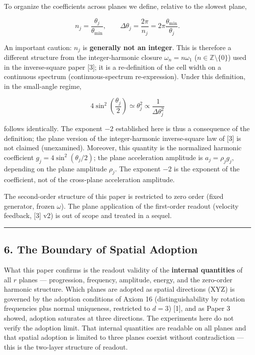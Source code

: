 \documentclass[
  a4paper,
]{article}
\begin{document}
To organize the coefficients across planes we define, relative to the
slowest plane,

\[
n_j=\frac{\theta_j}{\theta_{\min}},
\qquad
\Delta\theta_j=\frac{2\pi}{n_j}=2\pi\frac{\theta_{\min}}{\theta_j}.
\]

An important caution: \(n_j\) is \textbf{generally not an integer}. This
is therefore a different structure from the integer-harmonic closure
\(\omega_n=n\omega_1\) (\(n\in\mathbb Z\setminus\{0\}\)) used in the
inverse-square paper {[}3{]}; it is a re-definition of the cell width on
a continuous spectrum (continuous-spectrum re-expression). Under this
definition, in the small-angle regime,

\[
4\sin^2\!\left(\frac{\theta_j}{2}\right)\simeq\theta_j^2\propto\frac{1}{\Delta\theta_j^2}
\]

follows identically. The exponent \(-2\) established here is thus a
consequence of the definition; the plane version of the integer-harmonic
inverse-square law of {[}3{]} is not claimed (unexamined). Moreover,
this quantity is the normalized harmonic coefficient
\(g_j=4\sin^2(\theta_j/2)\); the plane acceleration amplitude is
\(a_j=\rho_jg_j\), depending on the plane amplitude \(\rho_j\). The
exponent \(-2\) is the exponent of the coefficient, not of the
cross-plane acceleration amplitude.

The second-order structure of this paper is restricted to zero order
(fixed generator, frozen \(\omega\)). The plane application of the
first-order readout (velocity feedback, {[}3{]} v2) is out of scope and
treated in a sequel.

\begin{center}\rule{0.5\linewidth}{0.5pt}\end{center}

\subsection{6. The Boundary of Spatial
Adoption}\label{the-boundary-of-spatial-adoption}

What this paper confirms is the readout validity of the \textbf{internal
quantities} of all \(r\) planes --- progression, frequency, amplitude,
energy, and the zero-order harmonic structure. Which planes are adopted
as spatial directions (XYZ) is governed by the adoption conditions of
Axiom 16 (distinguishability by rotation frequencies plus normal
uniqueness, restricted to \(d=3\)) {[}1{]}, and as Paper 3 showed,
adoption saturates at three directions. The experiments here do not
verify the adoption limit. That internal quantities are readable on all
planes and that spatial adoption is limited to three planes coexist
without contradiction --- this is the two-layer structure of readout.
\end{document}
